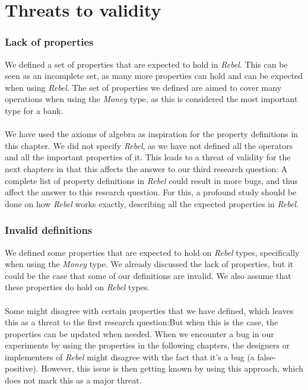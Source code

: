 \section{Threats to validity}
\subsubsection{Lack of properties}
We defined a set of properties that are expected to hold in \textit{Rebel}.
This can be seen as an incomplete set, as many more properties can hold and can
be expected when using \textit{Rebel}. The set of properties we defined are
aimed to cover many operations when using the \textit{Money} type, as this is
considered the most important type for a bank.\\
\\
We have used the axioms of algebra as inspiration for the property definitions
in this chapter. We did not specify \textit{Rebel}, as we have not defined all
the operators and all the important properties of it. This leads to a threat of
validity for the next chapters in that this affects the answer to our third
research question:\rqThree
A complete list of property definitions in
\textit{Rebel} could result in more bugs, and thus affect the answer to this
research question. For this, a profound study should be done on how
\textit{Rebel} works exactly, describing all the expected properties in
\textit{Rebel}.

\subsubsection{Invalid definitions}
We defined some properties that are expected to hold on \textit{Rebel} types,
specifically when using the \textit{Money} type. We already discussed the lack
of properties, but it could be the case that some of our definitions are
invalid. We also assume that these properties do hold on \textit{Rebel}
types.\\
\\
Some might disagree with certain properties that we have defined, which leaves
this as a threat to the first research question:\rqOne But when this is the
case, the properties can be updated when needed. When we encounter a bug in our
experiments by using the properties in the following chapters, the designers or
implementers of \textit{Rebel} might disagree with the fact that it's a bug
(a false-positive). However, this issue is then getting known by using this
approach, which does not mark this as a major threat.

